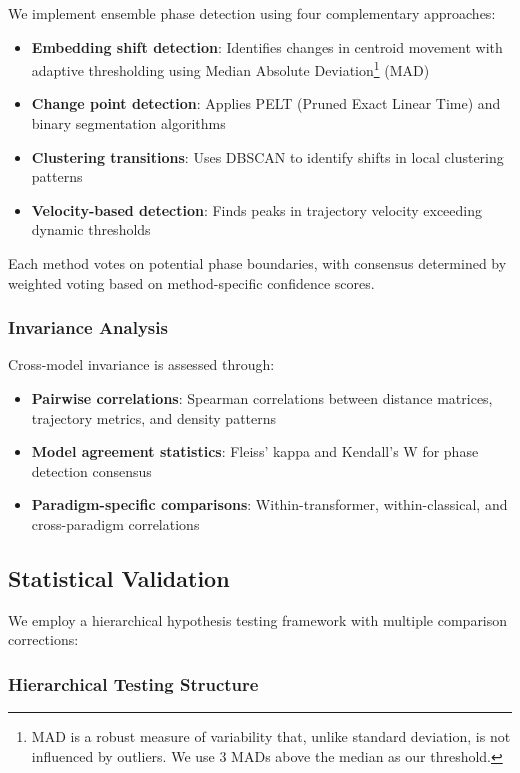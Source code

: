 \documentclass[11pt,letterpaper]{article}
\begin{document}
We implement ensemble phase detection using four complementary approaches:
\begin{itemize}
\item \textbf{Embedding shift detection}: Identifies changes in centroid movement with adaptive thresholding using Median Absolute Deviation\footnote{MAD is a robust measure of variability that, unlike standard deviation, is not influenced by outliers. We use 3 MADs above the median as our threshold.} (MAD)
\item \textbf{Change point detection}: Applies PELT (Pruned Exact Linear Time) and binary segmentation algorithms
\item \textbf{Clustering transitions}: Uses DBSCAN to identify shifts in local clustering patterns
\item \textbf{Velocity-based detection}: Finds peaks in trajectory velocity exceeding dynamic thresholds
\end{itemize}

Each method votes on potential phase boundaries, with consensus determined by weighted voting based on method-specific confidence scores.

\subsubsection{Invariance Analysis}

Cross-model invariance is assessed through:
\begin{itemize}
\item \textbf{Pairwise correlations}: Spearman correlations between distance matrices, trajectory metrics, and density patterns
\item \textbf{Model agreement statistics}: Fleiss' kappa and Kendall's W for phase detection consensus
\item \textbf{Paradigm-specific comparisons}: Within-transformer, within-classical, and cross-paradigm correlations
\end{itemize}

\subsection{Statistical Validation}

We employ a hierarchical hypothesis testing framework with multiple comparison corrections:


\subsubsection{Hierarchical Testing Structure}
\end{document}
